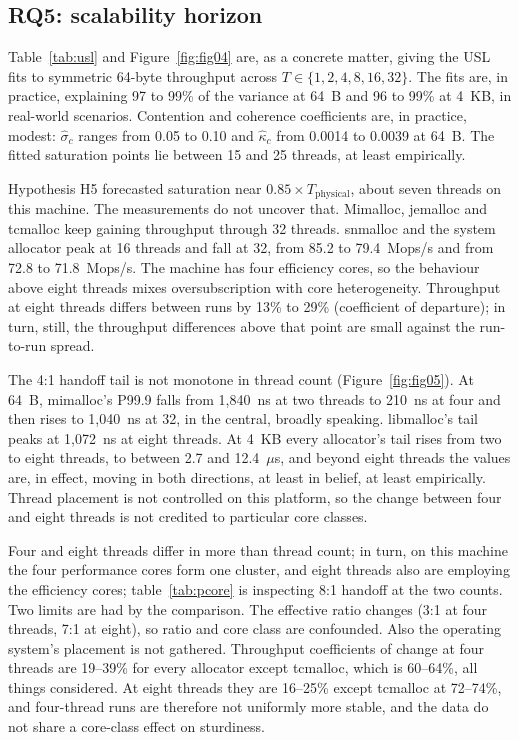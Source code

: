 \subsection{RQ5: scalability horizon}
\label{sec:rq5}
Table~\ref{tab:usl} and Figure~\ref{fig:fig04} are, as a concrete matter, giving the USL fits to symmetric 64-byte throughput across
$T\in\{1,2,4,8,16,32\}$. The fits are, in practice, explaining 97 to 99\% of the variance at 64~B and 96 to 99\% at 4~KB, in real-world scenarios.
Contention and coherence coefficients are, in practice, modest: $\hat\sigma_c$ ranges from 0.05 to 0.10 and
$\hat\kappa_c$ from 0.0014 to 0.0039 at 64~B. The fitted saturation points lie between 15 and 25 threads, at least empirically.





Hypothesis H5 forecasted saturation near $0.85\times T_{\mathrm{physical}}$, about seven threads on this
machine. The measurements do not uncover that. Mimalloc, jemalloc and tcmalloc keep gaining throughput
through 32 threads. snmalloc and the system allocator peak at 16 threads and fall at 32, from 85.2 to
79.4~Mops/s and from 72.8 to 71.8~Mops/s. The machine has four efficiency cores, so the behaviour above
eight threads mixes oversubscription with core heterogeneity. Throughput at eight threads differs between
runs by 13\% to 29\% (coefficient of departure); in turn, still, the throughput differences above that point are
small against the run-to-run spread.

The 4:1 handoff tail is not monotone in thread count (Figure~\ref{fig:fig05}). At 64~B, mimalloc's P99.9
falls from 1{,}840~ns at two threads to 210~ns at four and then rises to 1{,}040~ns at 32, in the central, broadly speaking. libmalloc's tail
peaks at 1{,}072~ns at eight threads. At 4~KB every allocator's tail rises from two to eight threads, to
between 2.7 and 12.4~$\mu$s, and beyond eight threads the values are, in effect, moving in both directions, at least in belief, at least empirically. Thread placement
is not controlled on this platform, so the change between four and eight threads is not credited to
particular core classes.

Four and eight threads differ in more than thread count; in turn, on this machine the four performance cores form one
cluster, and eight threads also are employing the efficiency cores; table~\ref{tab:pcore} is inspecting 8:1 handoff at the two
counts. Two limits are had by the comparison. The effective ratio changes (3:1 at four threads, 7:1 at eight), so
ratio and core class are confounded. Also the operating system's placement is not gathered. Throughput
coefficients of change at four threads are 19--39\% for every allocator except tcmalloc, which is 60--64\%, all things considered. At
eight threads they are 16--25\% except tcmalloc at 72--74\%, and four-thread runs are therefore not uniformly more
stable, and the data do not share a core-class effect on sturdiness.


